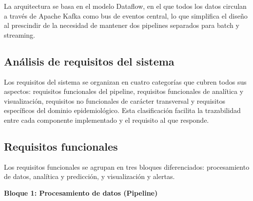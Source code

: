 \documentclass[12pt,a4paper]{article}
\begin{document}
La arquitectura se basa en el modelo Dataflow, en el que todos los datos circulan a través de Apache Kafka como bus de eventos central, lo que simplifica el diseño al prescindir de la necesidad de mantener dos pipelines separados para batch y streaming.

\subsection{\texorpdfstring{Análisis de requisitos del sistema}{Análisis de requisitos del sistema}}\label{anuxe1lisis-de-requisitos-del-sistema}

Los requisitos del sistema se organizan en cuatro categorías que cubren todos sus aspectos: requisitos funcionales del pipeline, requisitos funcionales de analítica y visualización, requisitos no funcionales de carácter transversal y requisitos específicos del dominio epidemiológico. Esta clasificación facilita la trazabilidad entre cada componente implementado y el requisito al que responde.

\subsection{\texorpdfstring{Requisitos funcionales}{Requisitos funcionales}}\label{requisitos-funcionales}

Los requisitos funcionales se agrupan en tres bloques diferenciados: procesamiento de datos, analítica y predicción, y visualización y alertas.

\textbf{Bloque 1: Procesamiento de datos (Pipeline)}
\end{document}
